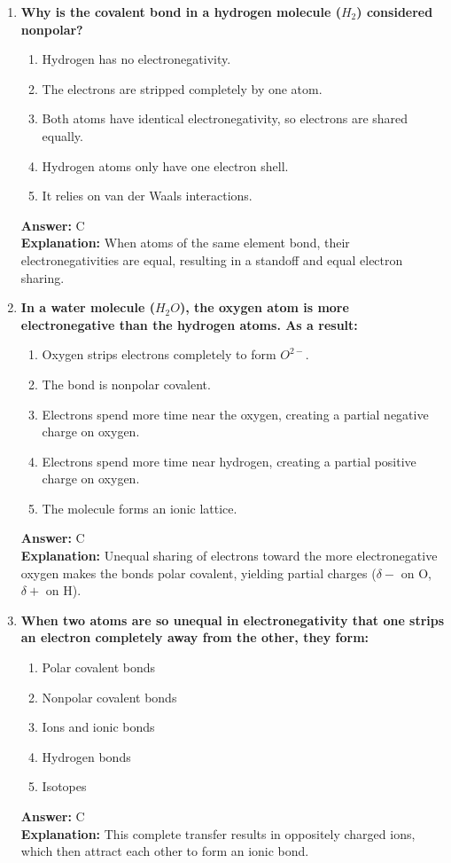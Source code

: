 \documentclass[11pt, a4paper]{article}
\begin{document}
\begin{enumerate}
\item \textbf{Why is the covalent bond in a hydrogen molecule ($H_2$) considered nonpolar?}
\begin{enumerate}[label=\Alph*.]
    \item Hydrogen has no electronegativity.
    \item The electrons are stripped completely by one atom.
    \item Both atoms have identical electronegativity, so electrons are shared equally.
    \item Hydrogen atoms only have one electron shell.
    \item It relies on van der Waals interactions.
\end{enumerate}
\textbf{Answer:} C \\
\textbf{Explanation:} When atoms of the same element bond, their electronegativities are equal, resulting in a standoff and equal electron sharing.

\item \textbf{In a water molecule ($H_2O$), the oxygen atom is more electronegative than the hydrogen atoms. As a result:}
\begin{enumerate}[label=\Alph*.]
    \item Oxygen strips electrons completely to form $O^{2-}$.
    \item The bond is nonpolar covalent.
    \item Electrons spend more time near the oxygen, creating a partial negative charge on oxygen.
    \item Electrons spend more time near hydrogen, creating a partial positive charge on oxygen.
    \item The molecule forms an ionic lattice.
\end{enumerate}
\textbf{Answer:} C \\
\textbf{Explanation:} Unequal sharing of electrons toward the more electronegative oxygen makes the bonds polar covalent, yielding partial charges ($\delta-$ on O, $\delta+$ on H).

\item \textbf{When two atoms are so unequal in electronegativity that one strips an electron completely away from the other, they form:}
\begin{enumerate}[label=\Alph*.]
    \item Polar covalent bonds
    \item Nonpolar covalent bonds
    \item Ions and ionic bonds
    \item Hydrogen bonds
    \item Isotopes
\end{enumerate}
\textbf{Answer:} C \\
\textbf{Explanation:} This complete transfer results in oppositely charged ions, which then attract each other to form an ionic bond.


\end{enumerate}
\end{document}
